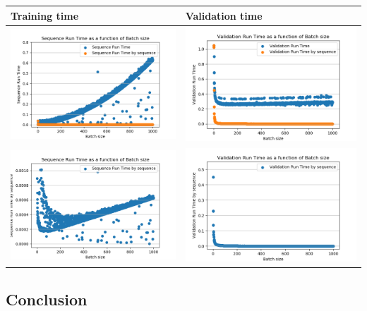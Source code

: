 \begin{longtable}[]{@{}ll@{}}
\hline
Training time & Validation time\tabularnewline
\hline
\endhead
\includegraphics[width=.45\textwidth]{parts/appendix/reports-papud/2018_07_11-Simultaneous_batches/sequence_time.png} &
\includegraphics[width=.45\textwidth]{parts/appendix/reports-papud/2018_07_11-Simultaneous_batches/valid_time.png}\tabularnewline
\includegraphics[width=.45\textwidth]{parts/appendix/reports-papud/2018_07_11-Simultaneous_batches/sequence_time_.png} &
\includegraphics[width=.45\textwidth]{parts/appendix/reports-papud/2018_07_11-Simultaneous_batches/valid_time_.png}\tabularnewline
\hline
\end{longtable}

\subsection{Conclusion}

